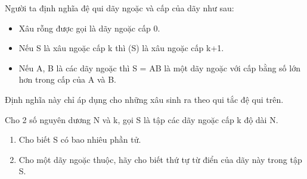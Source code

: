 Người ta định nghĩa đệ qui dãy ngoặc và cấp của dãy như sau:
\begin{itemize}
	\item Xâu rỗng được gọi là dãy ngoặc cấp 0.
	\item Nếu S là xâu ngoặc cấp k thì (S) là xâu ngoặc cấp k+1.
	\item Nếu A, B là các dãy ngoặc thì S = AB là một dãy ngoặc với cấp bằng số lớn hơn trong cấp của A và B.
\end{itemize}

Định nghĩa này chỉ áp dụng cho những xâu sinh ra theo qui tắc đệ qui trên.

Cho 2 số nguyên dương N và k, gọi S là tập các dãy ngoặc cấp k độ dài N.
\begin{enumerate}
	\item Cho biết S có bao nhiêu phần tử.
	\item Cho một dãy ngoặc thuộc, hãy cho biết thứ tự từ điển của dãy này trong tập S.
\end{enumerate}

\